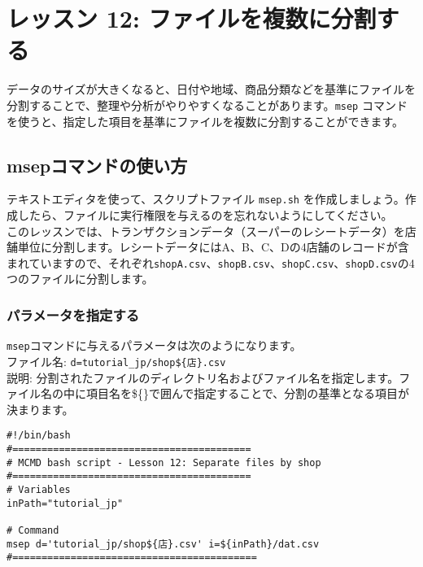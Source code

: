 

%

\setlength{\baselineskip}{4mm}

\section{レッスン 12: ファイルを複数に分割する}

データのサイズが大きくなると、日付や地域、商品分類などを基準にファイルを分割することで、整理や分析がやりやすくなることがあります。\verb|msep| コマンドを使うと、指定した項目を基準にファイルを複数に分割することができます。

\subsection{msepコマンドの使い方}

テキストエディタを使って、スクリプトファイル \verb|msep.sh| を作成しましょう。作成したら、ファイルに実行権限を与えるのを忘れないようにしてください。\\

このレッスンでは、トランザクションデータ（スーパーのレシートデータ）を店舗単位に分割します。レシートデータにはA、B、C、Dの4店舗のレコードが含まれていますので、それぞれ\verb|shopA.csv|、\verb|shopB.csv|、\verb|shopC.csv|、\verb|shopD.csv|の4つのファイルに分割します。
 
\subsubsection{パラメータを指定する}

{\setlength{\parindent}{0cm}

\verb|msep|コマンドに与えるパラメータは次のようになります。\\

ファイル名: \verb|d=tutorial_jp/shop${店}.csv| \\
説明: 分割されたファイルのディレクトリ名およびファイル名を指定します。ファイル名の中に項目名を\$\{\}で囲んで指定することで、分割の基準となる項目が決まります。\\
}

\begin{verbatim}
#!/bin/bash
#=========================================
# MCMD bash script - Lesson 12: Separate files by shop
#=========================================
# Variables
inPath="tutorial_jp"

# Command 
msep d='tutorial_jp/shop${店}.csv' i=${inPath}/dat.csv  
#==========================================
\end{verbatim}

